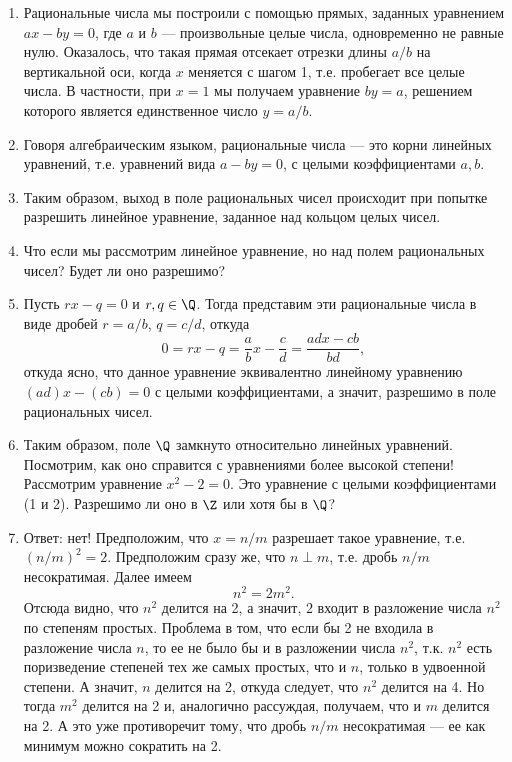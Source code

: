 
\begin{enumerate}
\item Рациональные числа мы построили с помощью прямых, заданных уравнением $ax-by=0$, где $a$ и $b$ --- произвольные целые числа, одновременно не равные нулю. Оказалось, что такая прямая отсекает отрезки длины $a/b$ на вертикальной оси, когда $x$ меняется с шагом 1, т.е. пробегает все целые числа. В частности, при $x=1$ мы получаем уравнение $by=a$, решением которого является единственное число $y=a/b$.
\item Говоря алгебраическим языком, рациональные числа --- это корни линейных уравнений, т.е. уравнений вида $a-by=0$, с целыми коэффициентами $a,b$.
\item Таким образом, выход в поле рациональных чисел происходит при попытке разрешить линейное уравнение, заданное над кольцом целых чисел.
\item Что если мы рассмотрим линейное уравнение, но над полем рациональных чисел? Будет ли оно разрешимо?
\item Пусть $rx-q=0$ и $r,q\in\Q$. Тогда представим эти рациональные числа в виде дробей $r=a/b$, $q=c/d$, откуда
$$
0=rx-q = \frac{a}{b}x-\frac{c}{d} = \frac{adx-cb}{bd},
$$
откуда ясно, что данное уравнение эквивалентно линейному уравнению $(ad)x-(cb)=0$ с целыми коэффициентами, а значит, разрешимо в поле рациональных чисел.
\item Таким образом, поле $\Q$ замкнуто относительно линейных уравнений. Посмотрим, как оно справится с уравнениями более высокой степени! Рассмотрим уравнение $x^2-2=0$. Это уравнение с целыми коэффициентами (1 и 2). Разрешимо ли оно в $\Z$ или хотя бы в $\Q$?
\item Ответ: нет! Предположим, что $x=n/m$ разрешает такое уравнение, т.е. $(n/m)^2=2$. Предположим сразу же, что $n\perp m$, т.е. дробь $n/m$ несократимая. Далее имеем
$$
n^2=2m^2.
$$
Отсюда видно, что $n^2$ делится на 2, а значит, $2$ входит в разложение числа $n^2$ по степеням простых. Проблема в том, что если бы 2 не входила в разложение числа $n$, то ее не было бы и в разложении числа $n^2$, т.к. $n^2$ есть поризведение степеней тех же самых простых, что и $n$, только в удвоенной степени. А значит, $n$ делится на 2, откуда следует, что $n^2$ делится на 4. Но тогда $m^2$ делится на 2 и, аналогично рассуждая, получаем, что и $m$ делится на 2. А это уже противоречит тому, что дробь $n/m$ несократимая --- ее как минимум можно сократить на 2.


\end{enumerate}
